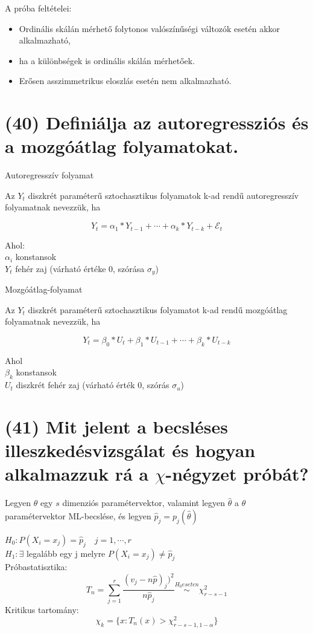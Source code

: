 \documentclass[12p]{article}
\begin{document}
A próba feltételei:
\begin{itemize}
	\item Ordinális skálán mérhető folytonos valószínűségi változók esetén akkor alkalmazható,
	\item ha a különbségek is ordinális skálán mérhetőek.
	\item Erősen asszimmetrikus eloszlás esetén nem alkalmazható.
\end{itemize}

\section{(40) Definiálja az autoregressziós és a mozgóátlag folyamatokat.}

Autoregresszív folyamat

Az $Y_t$ diszkrét paraméterű sztochasztikus
folyamatok k-ad rendű autoregresszív
folyamatnak nevezzük, ha

$$Y_t = \alpha_1 * Y_{t-1} + \cdots + \alpha_k * Y_{t-k} + \mathcal{E}_t$$

Ahol:\\
$\alpha_i$ konstansok\\
$Y_t$ fehér zaj (várható értéke 0, szórása $\sigma_y$)

Mozgóátlag-folyamat

Az $Y_t$ diszkrét paraméterű sztochasztikus
folyamatot k-ad rendű mozgóátlag folyamatnak
nevezzük, ha

$$Y_t = \beta_0 * U_t + \beta_1 * U_{t-1} + \cdots + \beta_k * U_{t-k}$$

Ahol\\
$\beta_k$ konstansok\\
$U_t$ diszkrét fehér zaj (várható érték 0, szórás $\sigma_u$)

\section{(41) Mit jelent a becsléses illeszkedésvizsgálat és hogyan alkalmazzuk rá a $\chi$-négyzet próbát?}

Legyen $\theta$ egy $s$ dimenziós paramétervektor, valamint legyen $\hat{\theta}$ a $\theta$ paramétervektor ML-becslése, és legyen $\hat{p}_j = p_j(\hat{\theta})$

$H_0 : P(X_i = x_j) = \hat{p}_j \quad j=1,\cdots,r$\\
$H_1 : \exists$ legalább egy j melyre $P(X_i = x_j) \neq \hat{p}_j$\\
Próbastatisztika: $$T_n = \sum^r_{j=1} \frac{(v_j - n\hat{p})_j)^2}{n\hat{p}_j} \stackrel{H_0 eseten}{\sim} \chi^2_{r-s-1}$$
Kritikus tartomány: $$\chi_k = \{x: T_n(x) > \chi^2_{r-s-1,1-\alpha}\}$$
\end{document}
